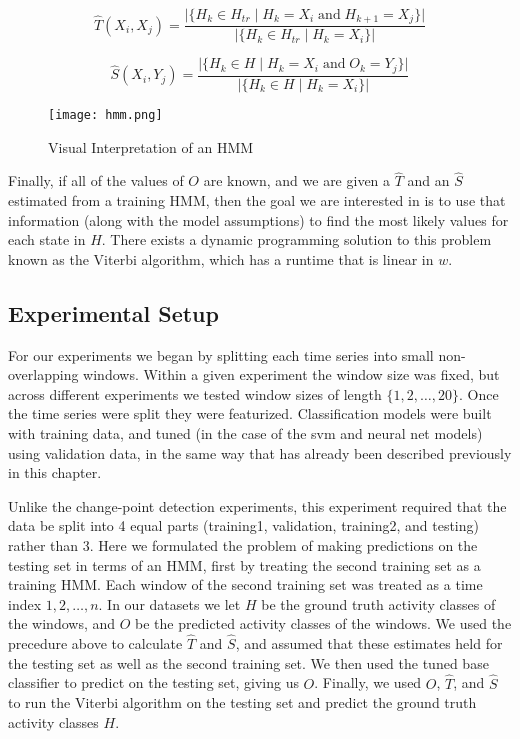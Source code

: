 \[
\hat{T}(X_i,X_j) = \frac{|\{H_k \in H_{tr} \; | \; H_k=X_i \; \text{and} \; H_{k+1}=X_j\}|} {|\{H_k \in H_{tr} \; | \; H_k=X_i\}|}
\]

\[
\hat{S}(X_i,Y_j) = \frac{|\{H_k \in H \; | \; H_k=X_i \; \text{and} \; O_k=Y_j\}|} {|\{H_k \in H \; | \; H_k=X_i\}|}
\]

\begin{figure}
 \centering
 \texttt{[image: hmm.png]}
 \caption{Visual Interpretation of an HMM}
 \label{fig:hmm}
\end{figure}

Finally, if all of the values of $O$ are known, and we are given
a $\hat{T}$ and an $\hat{S}$ estimated from a training HMM, then the goal we are interested in
is to use that information (along with the model assumptions)
to find the most likely values for each state in $H$. There
exists a dynamic programming solution to this problem known as the Viterbi
algorithm, which has a runtime that is linear in $w$. \cite{russell10}

\subsection{Experimental Setup}

For our experiments we began by splitting each time series into small non-overlapping windows. Within a
given experiment the window size was fixed, but across different experiments we
tested window sizes of length $\{1,2, \ldots ,20\}$. Once the time series were
split they were featurized. Classification
models were built with training data,
and tuned (in the case of the svm and neural net models) using validation data,
in the same way that has already been described previously in this chapter.


Unlike the change-point detection experiments, this experiment required
that the data be split into 4 equal parts (training1, validation, training2,
and testing) rather than 3. 
Here we formulated the problem of making predictions on the testing set in terms
of an HMM, first by treating the second training set as a training HMM. Each
window of the second training set was treated as a time index ${1,2, \ldots, n}$.
In our datasets we
let $H$ be the ground truth activity classes of the windows, and $O$ be the
predicted activity classes of the windows. We used the precedure above to
calculate $\hat{T}$ and $\hat{S}$, and assumed that these estimates held for
the testing set as well as the second training set. We then used the
tuned base classifier to predict on the testing set, giving us $O$. Finally,
we used $O$, $\hat{T}$, and $\hat{S}$ to run the Viterbi algorithm on the
testing set and predict the ground truth activity classes $H$.
